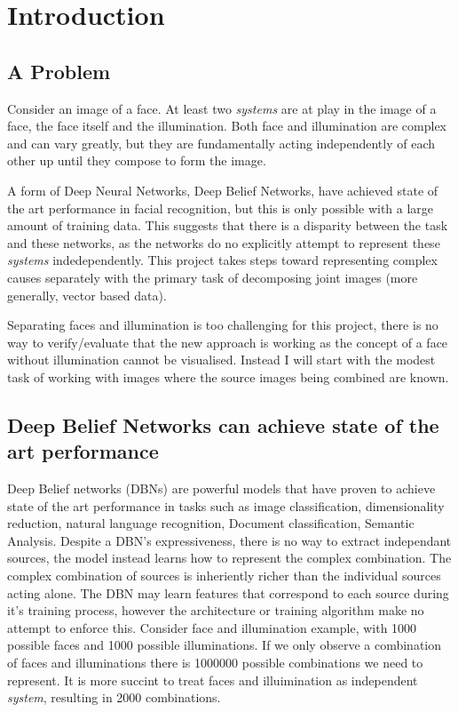 \chapter{Introduction}

\section{A Problem}
Consider an image of a face. At least two \emph{systems} are at play in the image of a face, the face itself and the illumination. Both face and illumination are complex and can vary greatly, but they are fundamentally acting independently of each other up until they compose to form the image.

A form of Deep Neural Networks, Deep Belief Networks, have achieved state of the art performance in facial recognition, but this is only possible with a large amount of training data. This suggests that there is a disparity between the task and these networks, as the networks do no explicitly attempt to represent these \emph{systems} indedependently. This project takes steps toward representing complex causes separately with the primary task of decomposing joint images (more generally, vector based data).

Separating faces and illumination is too challenging for this project, there is no way to verify/evaluate that the new approach is working as the concept of a face without illumination cannot be visualised. Instead I will start with the modest task of working with images where the source images being combined are known.

\section{Deep Belief Networks can achieve state of the art performance}
Deep Belief networks (DBNs) are powerful models that have proven to achieve state of the art performance in tasks such as image classification, dimensionality reduction, natural language recognition, Document classification, Semantic Analysis.\todocite{}
Despite a DBN's expressiveness, there is no way to extract independant sources, the model instead learns how to represent the complex combination. The complex combination of sources is inheriently richer than the individual sources acting alone. The DBN may learn features that correspond to each source during it's training process, however the architecture or training algorithm make no attempt to enforce this. Consider face and illumination example, with 1000 possible faces and 1000 possible illuminations. If we only observe a combination of faces and illuminations there is 1000000 possible combinations we need to represent. It is more succint to treat faces and illuimination as independent \emph{system}, resulting in 2000 combinations.

